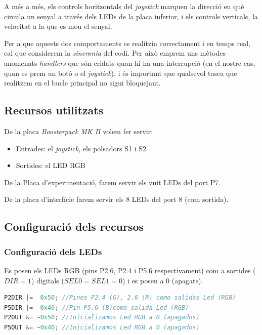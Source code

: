 \documentclass[12pt,a4paper]{article}
\begin{document}
A més a més, els controls horitzontals del \textit{joystick} marquen la direcció
en què circula un senyal a través dels LEDs de la placa inferior, i els controls
verticals, la velocitat a la que es mou el senyal.

Per a que aquests dos comportaments es realitzin correctament i en temps real,
cal que considerem la \textit{sincronia} del codi. Per això emprem uns mètodes
anomenats \textit{handlers} que són cridats quan hi ha una interrupció (en el
nostre cas, quan es prem un botó o el \textit{joystick}), i és important que
qualsevol tasca que realitzem en el bucle principal no sigui bloquejant.

\subsection{Recursos utilitzats}
De la placa \textit{Boosterpack MK II} volem fer servir:

\begin{itemize}
    \item Entrades: el \textit{joystick}, els polsadors S1 i S2
    \item Sortides: el LED RGB
\end{itemize}

De la Placa d'experimentació, farem servir els vuit LEDs del port P7.

De la placa d'interfície farem servir els 8 LEDs del port 8 (com sortida).

\subsection{Configuració dels recursos}
\subsubsection{Configuració dels LEDs}
Es posen els LEDs RGB (pins P2.6, P2.4 i P5.6 respectivament) com a sortides ($DIR = 1$) digitals ($SEL0 = SEL1 = 0$) i es posen a 0 (apagats).

\begin{lstlisting}[language=C]
P2DIR |=  0x50; //Pines P2.4 (G), 2.6 (R) como salidas Led (RGB)
P5DIR |=  0x40; //Pin P5.6 (B)como salida Led (RGB)
P2OUT &= ~0x50; //Inicializamos Led RGB a 0 (apagados)
P5OUT &= ~0x40; //Inicializamos Led RGB a 0 (apagados)
\end{lstlisting}
\end{document}
